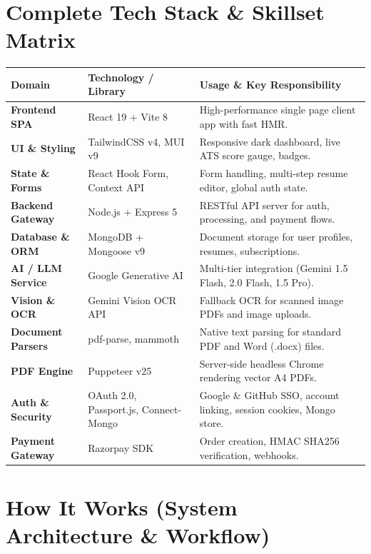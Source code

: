 \documentclass[11pt,a4paper]{article}
\begin{document}
\section{Complete Tech Stack \& Skillset Matrix}

\noindent
\begin{tcolorbox}[colback=white,colframe=darkbg!80,title=\textbf{Production Tech Stack \& Skillset Breakdown},fonttitle=\bfseries]
\small
\begin{tabular}{llp{7.2cm}}
\toprule
\textbf{Domain} & \textbf{Technology / Library} & \textbf{Usage \& Key Responsibility} \\
\midrule
\textbf{Frontend SPA} & React 19 + Vite 8 & High-performance single page client app with fast HMR. \\
\textbf{UI \& Styling} & TailwindCSS v4, MUI v9 & Responsive dark dashboard, live ATS score gauge, badges. \\
\textbf{State \& Forms} & React Hook Form, Context API & Form handling, multi-step resume editor, global auth state. \\
\textbf{Backend Gateway} & Node.js + Express 5 & RESTful API server for auth, processing, and payment flows. \\
\textbf{Database \& ORM} & MongoDB + Mongoose v9 & Document storage for user profiles, resumes, subscriptions. \\
\textbf{AI / LLM Service} & Google Generative AI & Multi-tier integration (Gemini 1.5 Flash, 2.0 Flash, 1.5 Pro). \\
\textbf{Vision \& OCR} & Gemini Vision OCR API & Fallback OCR for scanned image PDFs and image uploads. \\
\textbf{Document Parsers} & pdf-parse, mammoth & Native text parsing for standard PDF and Word (.docx) files. \\
\textbf{PDF Engine} & Puppeteer v25 & Server-side headless Chrome rendering vector A4 PDFs. \\
\textbf{Auth \& Security} & OAuth 2.0, Passport.js, Connect-Mongo & Google \& GitHub SSO, account linking, session cookies, Mongo store. \\
\textbf{Payment Gateway} & Razorpay SDK & Order creation, HMAC SHA256 verification, webhooks. \\
\bottomrule
\end{tabular}
\end{tcolorbox}

\section{How It Works (System Architecture \& Workflow)}
\end{document}
